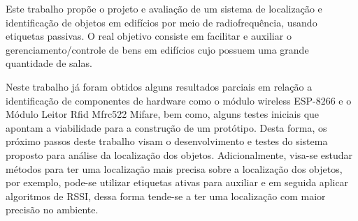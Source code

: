 
\label{chapter:consideracoes}

Este trabalho propõe o projeto e avaliação de um sistema de localização e identificação de objetos em edifícios por meio de
radiofrequência, usando etiquetas passivas. O real objetivo consiste em facilitar e auxiliar o gerenciamento/controle de
bens em edifícios cujo possuem uma grande quantidade de salas.

Neste trabalho já foram obtidos alguns resultados parciais em relação a identificação de componentes de hardware como o módulo wireless
ESP-8266 e o Módulo Leitor Rfid Mfrc522 Mifare, bem como, alguns testes iniciais que apontam a viabilidade para a construção de um
protótipo. Desta forma, os próximo passos deste trabalho visam o desenvolvimento e testes do sistema proposto para análise da
localização dos objetos. Adicionalmente, visa-se estudar métodos para ter uma localização mais precisa sobre a localização dos
objetos, por exemplo, pode-se utilizar etiquetas ativas para auxiliar e em seguida aplicar algoritmos de RSSI, dessa forma
tende-se a ter uma localização com maior precisão no ambiente.



